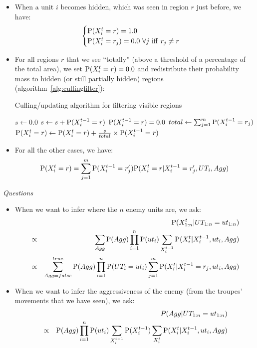 \begin{itemize}
    \item When a unit $i$ becomes hidden, which was seen in region $r$ just before, we have:
\begin{eqnarray*}
\begin{cases}
\mathrm{P}(X^t_{i} = r) = 1.0\\
\mathrm{P}(X^t_{i} = r_j) = 0.0\ \forall j \ \mathrm{iff}\ r_j \neq r
\end{cases}
\end{eqnarray*}

    \item For all regions $r$ that we see ``totally'' (above a threshold of a percentage of the total area), we set $\mathrm{P}(X^t_i = r) = 0.0$ and redistribute their probability mass to hidden (or still partially hidden) regions (algorithm~\ref{alg:cullingfilter}):
\begin{algorithm}[!h]
\caption{Culling/updating algorithm for filtering visible regions}
\label{alg:cullingfilter}
\begin{algorithmic}
    \State $s \leftarrow 0.0$
        \State $s \leftarrow s + \mathrm{P}(X^{t-1}_i = r)$
        \State $\mathrm{P}(X^{t-1}_i = r) = 0.0$
    \EndFor
    \State $total \leftarrow \sum_{j=1}^m \mathrm{P}(X^{t-1}_i=r_j)$
        \State $\mathrm{P}(X^t_i = r) \leftarrow \mathrm{P}(X^t_i = r) + \frac{s}{total}\times \mathrm{P}(X^{t-1}_i = r)$
    \EndFor
\EndFor
\end{algorithmic}
\end{algorithm}

    \item For all the other cases, we have:
$$\mathrm{P}(X^t_{i} = r) = \sum_{j=1}^{m} \mathrm{P}(X^{t-1}_i = r_j')\mathrm{P}(X^t_i = r | X^{t-1}_i = r_j', UT_i, Agg)$$
\end{itemize}

\vspace{0.3cm}
\textit{Questions}\\

\begin{itemize}
    \item When we want to infer where the $n$ enemy units are, we ask:
\begin{eqnarray*}
& & \mathrm{P}(X_{1:n}^t| UT_{1:n}=ut_{1:n})\\
& \propto & \sum_{Agg} \mathrm{P}(Agg) \prod_{i=1}^n \mathrm{P}(ut_i) \sum_{X_i^{t-1}} \mathrm{P}(X_i^t|X_i^{t-1},ut_i,Agg)\\
& \propto & \sum_{Agg=false}^{true} \mathrm{P}(Agg) \prod_{i=1}^n \mathrm{P}(UT_i=ut_i) \sum_{j = 1}^{m} \mathrm{P}(X_i^t|X_i^{t-1}=r_j,ut_i,Agg)
\end{eqnarray*}
    \item When we want to infer the aggressiveness of the enemy (from the troupes' movements that we have seen), we ask:
\begin{eqnarray*}
& & P(Agg | UT_{1:n} = ut_{1:n})\\
& \propto & \mathrm{P}(Agg) \prod_{i=1}^{n} \mathrm{P}(ut_i)\sum_{X_i^{t-1}}\mathrm{P}(X_i^{t-1}) \sum_{X_i^{t}}  \mathrm{P}(X_i^t|X_i^{t-1},ut_i,Agg) 
\end{eqnarray*}
\end{itemize}

